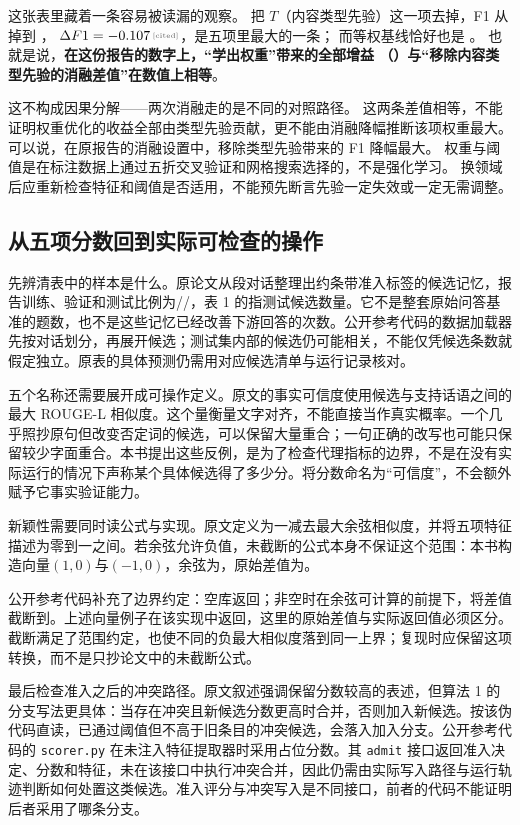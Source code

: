 这张表里藏着一条容易被读漏的观察。
把 $T$（内容类型先验）这一项去掉，F1 从  掉到 ，
$\Delta F1=\cited{-0.107}$，是五项里最大的一条；
而等权基线恰好也是 \cite{amac-2603}。
也就是说，\textbf{在这份报告的数字上，“学出权重”带来的全部增益
（）与“移除内容类型先验的消融差值”在数值上相等}。

这不构成因果分解——两次消融走的是不同的对照路径。
这两条差值相等，不能证明权重优化的收益全部由类型先验贡献，更不能由消融降幅推断该项权重最大。
可以说，在原报告的消融设置中，移除类型先验带来的 F1 降幅最大。
权重与阈值是在标注数据上通过五折交叉验证和网格搜索选择的，不是强化学习。
换领域后应重新检查特征和阈值是否适用，不能预先断言先验一定失效或一定无需调整。


\subsection{从五项分数回到实际可检查的操作}

先辨清表中的样本是什么。原论文从段对话整理出约条带准入标签的候选记忆，报告训练、验证和测试比例为//，表 1 的指测试候选数量\cite{amac-2603}。它不是整套原始问答基准的题数，也不是这些记忆已经改善下游回答的次数。公开参考代码的数据加载器先按对话划分，再展开候选\cite{amac-code-2026}；测试集内部的候选仍可能相关，不能仅凭候选条数就假定独立。原表的具体预测仍需用对应候选清单与运行记录核对。

五个名称还需要展开成可操作定义。原文的事实可信度使用候选与支持话语之间的最大 ROUGE-L 相似度\cite{amac-2603}。这个量衡量文字对齐，不能直接当作真实概率。一个几乎照抄原句但改变否定词的候选，可以保留大量重合；一句正确的改写也可能只保留较少字面重合。本书提出这些反例，是为了检查代理指标的边界，不是在没有实际运行的情况下声称某个具体候选得了多少分。将分数命名为“可信度”，不会额外赋予它事实验证能力。

新颖性需要同时读公式与实现。原文定义为一减去最大余弦相似度，并将五项特征描述为零到一之间\cite{amac-2603}。若余弦允许负值，未截断的公式本身不保证这个范围：本书构造向量$(1,0)$与$(-1,0)$，余弦为，原始差值为。

公开参考代码补充了边界约定\cite{amac-code-2026}：空库返回；非空时在余弦可计算的前提下，将差值截断到\cited{[0,1]}。上述向量例子在该实现中返回，这里的原始差值与实际返回值必须区分。截断满足了范围约定，也使不同的负最大相似度落到同一上界；复现时应保留这项转换，而不是只抄论文中的未截断公式。

最后检查准入之后的冲突路径。原文叙述强调保留分数较高的表述，但算法 1 的分支写法更具体：当存在冲突且新候选分数更高时合并，否则加入新候选\cite{amac-2603}。按该伪代码直读，已通过阈值但不高于旧条目的冲突候选，会落入加入分支。公开参考代码的 \texttt{scorer.py} 在未注入特征提取器时采用占位分数。其 \texttt{admit} 接口返回准入决定、分数和特征，未在该接口中执行冲突合并\cite{amac-code-2026}，因此仍需由实际写入路径与运行轨迹判断如何处置这类候选。准入评分与冲突写入是不同接口，前者的代码不能证明后者采用了哪条分支。


